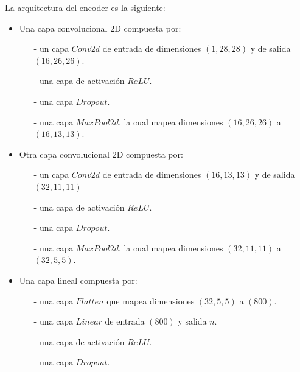 \documentclass[aps,prl,reprint,groupedaddress]{revtex4-2}
\begin{document}
La arquitectura del encoder es la siguiente:
\begin{itemize}
  \item Una capa convolucional 2D compuesta por:
  \begin{itemize}
    \item [-] un capa $Conv2d$ de entrada de dimensiones $(1, 28, 28)$ y de 
    salida $(16, 26, 26)$.
    \item [-] una capa de activación $ReLU$.
    \item [-] una capa $Dropout$.
    \item [-] una capa $MaxPool2d$, la cual mapea dimensiones $(16, 26, 26)$ a
    $(16, 13, 13)$.
  \end{itemize}
  \item Otra capa convolucional 2D compuesta por:
  \begin{itemize}
    \item [-] un capa $Conv2d$ de entrada de dimensiones $(16, 13, 13)$ y de 
    salida $(32, 11, 11)$
    \item [-] una capa de activación $ReLU$.
    \item [-] una capa $Dropout$.
    \item [-] una capa $MaxPool2d$, la cual mapea dimensiones $(32, 11, 11)$ a
    $(32, 5, 5)$.
  \end{itemize}
  \item Una capa lineal compuesta por:
  \begin{itemize}
    \item [-] una capa $Flatten$ que mapea dimensiones $(32, 5, 5)$ a $(800)$.
    \item [-] una capa $Linear$ de entrada $(800)$ y salida $n$.
    \item [-] una capa de activación $ReLU$.
    \item [-] una capa $Dropout$.
  \end{itemize}
\end{itemize}
\end{document}
